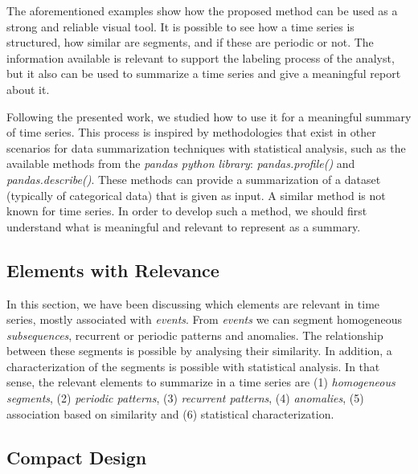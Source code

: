 The aforementioned examples show how the proposed method can be used as a strong and reliable visual tool. It is possible to see how a time series is structured, how similar are segments, and if these are periodic or not. The information available is relevant to support the labeling process of the analyst, but it also can be used to summarize a time series and give a meaningful report about it. 
\par
Following the presented work, we studied how to use it for a meaningful summary of time series. This process is inspired by methodologies that exist in other scenarios for data summarization techniques with statistical analysis, such as the available methods from the \textit{pandas python library}: \textit{pandas.profile()} and \textit{pandas.describe()}. These methods can provide a summarization of a dataset (typically of categorical data) that is given as input. A similar method is not known for time series. In order to develop such a method, we should first understand what is meaningful and relevant to represent as a summary.

\subsection{Elements with Relevance}

In this section, we have been discussing which elements are relevant in time series, mostly associated with \textit{events}. From \textit{events} we can segment homogeneous \textit{subsequences}, recurrent or periodic patterns and anomalies. The relationship between these segments is possible by analysing their similarity. In addition, a characterization of the segments is possible with statistical analysis. In that sense, the relevant elements to summarize in a time series are (1) \textit{homogeneous segments}, (2) \textit{periodic patterns}, (3) \textit{recurrent patterns}, (4) \textit{anomalies}, (5) association based on similarity and (6) statistical characterization.

\subsection{Compact Design}

